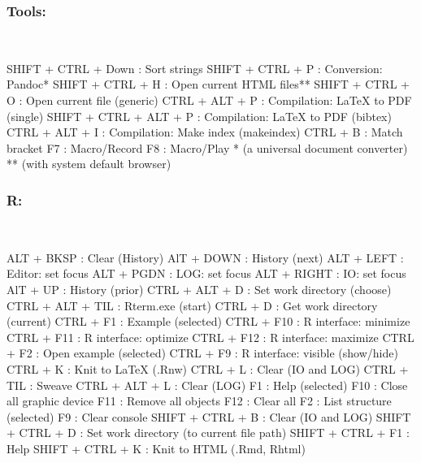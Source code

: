 \newpage
\subsubsection{Tools:}\\

\vspace{-0.5cm}
\begin{Rtables}[caption={[Tools menu keyboard shortcuts]
    ToolsMenu keyboard shortcuts},
  label=menu:tools]
  SHIFT + CTRL + Down    : Sort strings
  SHIFT + CTRL + P       : Conversion: Pandoc*
  SHIFT + CTRL + H       : Open current HTML files**
  SHIFT + CTRL + O       : Open current file (generic)
  CTRL  + ALT  + P       : Compilation: LaTeX to PDF (single)
  SHIFT + CTRL + ALT + P : Compilation: LaTeX to PDF (bibtex)
  CTRL  + ALT  + I       : Compilation: Make index (makeindex)
  CTRL  + B              : Match bracket
  F7                     : Macro/Record
  F8                     : Macro/Play
  *  (a universal document converter)
  ** (with system default browser)
\end{Rtables}


\subsubsection{R:}\\

\vspace{-0.5cm}
\begin{Rtables}[caption={[R menu keyboard shortcuts]
    R menu keyboard shortcuts},
  label=menu:r]
  ALT  + BKSP       : Clear (History)
  AlT  + DOWN       : History (next)
  ALT  + LEFT       : Editor: set focus
  ALT  + PGDN       : LOG: set focus
  ALT  + RIGHT      : IO: set focus
  AlT  + UP         : History (prior)
  CTRL + ALT  + D   : Set work directory (choose)
  CTRL + ALT + TIL  : Rterm.exe (start)
  CTRL + D          : Get work directory (current)
  CTRL + F1         : Example (selected)
  CTRL + F10        : R interface: minimize
  CTRL + F11        : R interface: optimize
  CTRL + F12        : R interface: maximize
  CTRL + F2         : Open example (selected)
  CTRL + F9         : R interface: visible (show/hide)
  CTRL + K          : Knit to LaTeX (.Rnw)
  CTRL + L          : Clear (IO and LOG)
  CTRL + TIL        : Sweave
  CTRL + ALT + L    : Clear (LOG)
  F1                : Help (selected)
  F10               : Close all graphic device
  F11               : Remove all objects
  F12               : Clear all
  F2                : List structure (selected)
  F9                : Clear console
  SHIFT + CTRL + B  : Clear (IO and LOG)
  SHIFT + CTRL + D  : Set work directory (to current file path)
  SHIFT + CTRL + F1 : Help
  SHIFT + CTRL + K  : Knit to HTML (.Rmd, Rhtml)
\end{Rtables}



